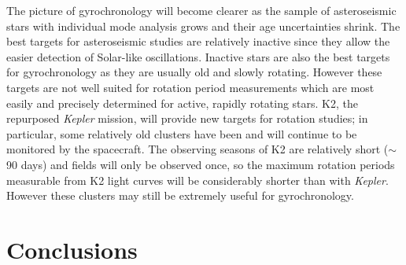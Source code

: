 The picture of gyrochronology will become clearer as the sample of
asteroseismic stars with individual mode analysis grows and their age
uncertainties shrink.
The best targets for asteroseismic studies are relatively inactive since they
allow the easier detection of Solar-like oscillations.
Inactive stars are also the best targets for gyrochronology as they are
usually old and slowly rotating.
However these targets are not well suited for
rotation period measurements which are most easily and precisely determined
for active, rapidly rotating stars.
K2, the repurposed {\it Kepler} mission, will provide new targets for rotation
studies; in particular, some relatively old clusters have been and will
continue to be monitored by the spacecraft.
The observing seasons of K2 are relatively short ($\sim$ 90 days) and fields
will only be observed once, so the maximum rotation periods measurable from
K2 light curves will be considerably shorter than with {\it Kepler}.
However these clusters may still be extremely useful for gyrochronology.

\section{Conclusions}
\label{sec:conclusions}

